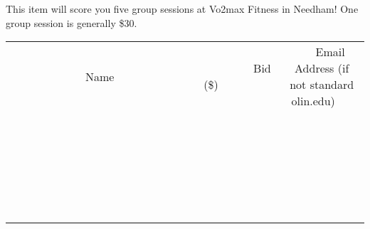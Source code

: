 \documentclass[11pt]{article}
\begin{document}
This item will score you five group sessions at Vo2max Fitness in Needham! One group session is generally \$30.
\\[6ex]
\begin{tabular}{c c c}
~~~~~~~~~~~~~Name~~~~~~~~~~~~~ & ~~~~~~~~~Bid (\$)~~~~~~~~~  & ~~~Email Address (if not standard olin.edu)~~~\\
 & & \\
\hline
 & & \\
\hline
 & & \\
\hline
 & & \\
\hline
 & & \\
\hline
 & & \\
\hline
 & & \\
\hline
 & & \\
\hline
 & & \\
\hline
 & & \\
\hline
 & & \\
\hline
 & & \\
\hline
 & & \\
\hline
 & & \\
\hline
 & & \\
\hline
 & & \\
\hline
 & & \\
\hline
 & & \\
\hline
 & & \\
\hline
 & & \\
\hline
 & & \\
\hline
 & & \\
\hline
 & & \\
\hline
 & & \\
\hline
 & & \\
\hline
 & & \\
\hline
\end{tabular}
\newpage
\end{document}
